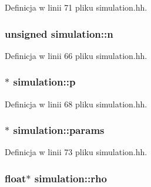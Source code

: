 Definicja w linii 71 pliku simulation.\+hh.

\hypertarget{classsimulation_a22eb97765a5c60adf3d995f7a110da70}{}
\subsubsection[{n}]{\setlength{\rightskip}{0pt plus 5cm}unsigned simulation\+::n\hspace{0.3cm}{\ttfamily [private]}}\label{classsimulation_a22eb97765a5c60adf3d995f7a110da70}


Definicja w linii 66 pliku simulation.\+hh.

\hypertarget{classsimulation_a5412fd01febe99f12ae38e30eb692ff0}{}
\subsubsection[{p}]{$\ast$ simulation\+::p\hspace{0.3cm}{\ttfamily [private]}}\label{classsimulation_a5412fd01febe99f12ae38e30eb692ff0}


Definicja w linii 68 pliku simulation.\+hh.

\hypertarget{classsimulation_a861b82cc3c0e7e58abfba464a133dae3}{}
\subsubsection[{params}]{$\ast$ simulation\+::params\hspace{0.3cm}{\ttfamily [private]}}\label{classsimulation_a861b82cc3c0e7e58abfba464a133dae3}


Definicja w linii 73 pliku simulation.\+hh.

\hypertarget{classsimulation_a44081d4edd92e17a3e1067b976031a00}{}
\subsubsection[{rho}]{\setlength{\rightskip}{0pt plus 5cm}float$\ast$ simulation\+::rho\hspace{0.3cm}{\ttfamily [private]}}\label{classsimulation_a44081d4edd92e17a3e1067b976031a00}


